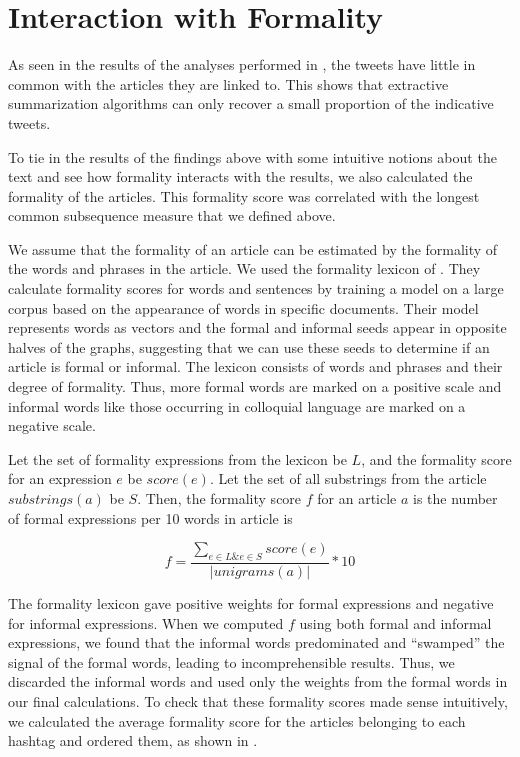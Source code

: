 \section{Interaction with Formality}

As seen in the results of the analyses performed in , the tweets have little in common with the articles they are linked to. This shows that extractive summarization algorithms can only recover a small proportion of the indicative tweets. 

To tie in the results of the findings above with some intuitive notions about the text and see how formality interacts with the results, we also calculated the formality of the articles. This formality score was correlated with the longest common subsequence measure that we defined above. 

We assume that the formality of an article can be estimated by the formality of the words and phrases in the article. We used the formality lexicon of . They calculate formality scores for words and sentences by training a model on a large corpus based on the appearance of words in specific documents. Their model represents words as vectors and the formal and informal seeds appear in opposite halves of the graphs, suggesting that we can use these seeds to determine if an article is formal or informal. The lexicon consists of words and phrases and their degree of formality. Thus, more formal words are marked on a positive scale and informal words like those occurring in colloquial language are marked on a negative scale. 

Let the set of formality expressions from the lexicon be $L$, and the formality score for an expression $e$ be $\textit{score}(e)$. Let the set of all substrings from the article $\textit{substrings}(a)$ be $S$. Then, the formality score $f$ for an article $a$ is the number of formal expressions per 10 words in article is   

\begin{equation}
f = \frac{\sum\limits_{e \in L \& e \in S} \textit{score}(e)}{| \textit{unigrams}(a) |} * 10
\end{equation}

The formality lexicon gave positive weights for formal expressions and negative for informal expressions. When we computed $f$ using both formal and informal expressions, we found that the informal words predominated and ``swamped'' the signal of the formal words, leading to incomprehensible results. Thus, we discarded the informal words and used only the weights from the formal words in our final calculations. To check that these formality scores made sense intuitively, we calculated the average formality score for the articles belonging to each hashtag and ordered them, as shown in .

